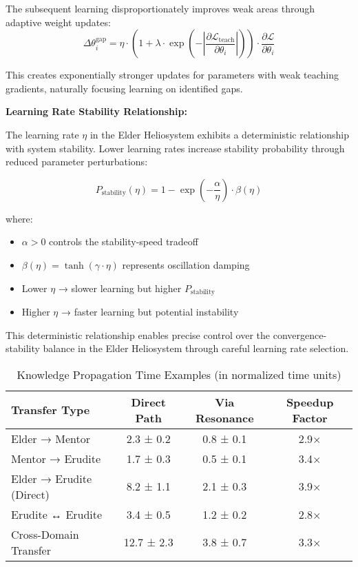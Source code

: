 The subsequent learning disproportionately improves weak areas through adaptive weight updates:
\begin{equation}
\Delta\theta_i^{\text{gap}} = \eta \cdot \left(1 + \lambda \cdot \exp\left(-\left|\frac{\partial \mathcal{L}_{\text{teach}}}{\partial \theta_i}\right|\right)\right) \cdot \frac{\partial \mathcal{L}}{\partial \theta_i}
\end{equation}

This creates exponentially stronger updates for parameters with weak teaching gradients, naturally focusing learning on identified gaps.

\textbf{Learning Rate Stability Relationship:}

The learning rate $\eta$ in the Elder Heliosystem exhibits a deterministic relationship with system stability. Lower learning rates increase stability probability through reduced parameter perturbations:

\begin{equation}
P_{\text{stability}}(\eta) = 1 - \exp\left(-\frac{\alpha}{\eta}\right) \cdot \beta(\eta)
\end{equation}

where:
\begin{itemize}
    \item $\alpha > 0$ controls the stability-speed tradeoff
    \item $\beta(\eta) = \tanh(\gamma \cdot \eta)$ represents oscillation damping
    \item Lower $\eta$ → slower learning but higher $P_{\text{stability}}$
    \item Higher $\eta$ → faster learning but potential instability
\end{itemize}

This deterministic relationship enables precise control over the convergence-stability balance in the Elder Heliosystem through careful learning rate selection.

\begin{table}[h]
\centering
\caption{Knowledge Propagation Time Examples (in normalized time units)}
\begin{tabular}{|l|c|c|c|}
\hline
\textbf{Transfer Type} & \textbf{Direct Path} & \textbf{Via Resonance} & \textbf{Speedup Factor} \\
\hline
Elder → Mentor & 2.3 ± 0.2 & 0.8 ± 0.1 & 2.9× \\
Mentor → Erudite & 1.7 ± 0.3 & 0.5 ± 0.1 & 3.4× \\
Elder → Erudite (Direct) & 8.2 ± 1.1 & 2.1 ± 0.3 & 3.9× \\
Erudite ↔ Erudite & 3.4 ± 0.5 & 1.2 ± 0.2 & 2.8× \\
Cross-Domain Transfer & 12.7 ± 2.3 & 3.8 ± 0.7 & 3.3× \\
\hline
\end{tabular}
\end{table}

